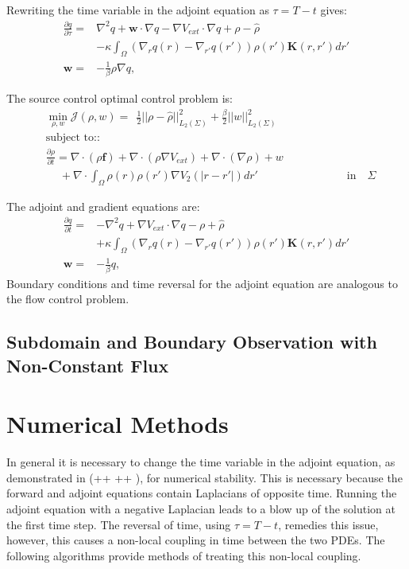 \documentclass[11pt, a4paper]{article}
\theoremstyle{definition}
\newcommand{\Sta}{\rho}
\newcommand{\Adjb}{q}
\newcommand{\Con}{\mathbf{f}}
\begin{document}
Rewriting the time variable in the adjoint equation as $\tau = T-t$ gives:
\begin{align*}
\frac{\partial \Adjb}{\partial \tau} =& \nabla^2\Adjb +\mathbf{w} \cdot \nabla \Adjb - \nabla V_{ext} \cdot \nabla \Adjb + \Sta - \hat \rho \\
&-\kappa \int_\Omega (\nabla_r \Adjb(r) - \nabla_{r'} \Adjb(r') ) \rho(r') \mathbf{K}(r,r') dr'\\
\mathbf{w} =& - \frac{1}{\beta} \Sta \nabla \Adjb,
\end{align*}

The source control optimal control problem is:
\begin{align*}
&\min_{\Sta,{w} } \mathcal J(\Sta,{w}) = \ \ \frac{1}{2}||\Sta - \hat \Sta||_{L_2(\Sigma)}^2  +\frac{\beta}{2}||{w}||_{L_2(\Sigma)}^2\\
& \text{subject to:}:\\
&\frac{\partial \Sta}{\partial  t} = \nabla \cdot (\Sta\Con) + \nabla \cdot (\rho\nabla V_{ext}) + \nabla \cdot (\nabla \rho) + w \\
& \quad \ +\nabla \cdot \int_\Omega \Sta(r)\Sta(r') \nabla V_2(|r-r'|)dr' \qquad \qquad \qquad \qquad \text{in} \quad \Sigma
\end{align*}

The adjoint and gradient equations are:
\begin{align*}
\frac{\partial \Adjb}{\partial t} =& - \nabla^2 \Adjb + \nabla V_{ext} \cdot \nabla \Adjb - \Sta + \hat \rho \\
&+\kappa \int_\Omega (\nabla_r \Adjb(r) - \nabla_{r'} \Adjb(r') ) \rho(r') \mathbf{K}(r,r') dr'\\
\mathbf{w} =& - \frac{1}{\beta} \Adjb,
\end{align*}
Boundary conditions and time reversal for the adjoint equation are analogous to the flow control problem.

\subsection{Subdomain and Boundary Observation with Non-Constant Flux}


\section{Numerical Methods}
In general it is necessary to change the time variable in the adjoint equation, as demonstrated in (++ ++ ), for numerical stability. This is necessary because the forward and adjoint equations contain Laplacians of opposite time. Running the adjoint equation with a negative Laplacian leads to a blow up of the solution at the first time step. The reversal of time, using $\tau = T-t$, remedies this issue, however, this causes a non-local coupling in time between the two PDEs.
The following algorithms provide methods of treating this non-local coupling.
\end{document}
